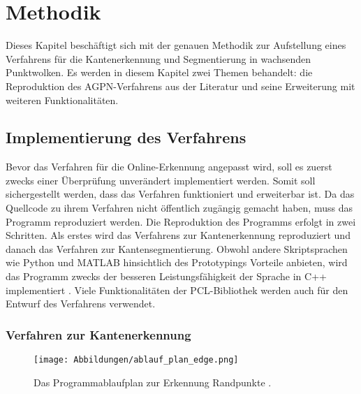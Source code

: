 

\chapter{Methodik} \label{Methodik}
Dieses Kapitel beschäftigt sich mit der genauen Methodik zur Aufstellung eines Verfahrens für die Kantenerkennung und Segmentierung in wachsenden Punktwolken. Es werden in diesem Kapitel zwei Themen behandelt: die Reproduktion des AGPN-Verfahrens aus der Literatur und seine Erweiterung mit weiteren Funktionalitäten. 

\section{Implementierung des Verfahrens}
Bevor das Verfahren für die Online-Erkennung angepasst wird, soll es zuerst zwecks einer Überprüfung unverändert implementiert werden. Somit soll sichergestellt werden, dass das Verfahren funktioniert und erweiterbar ist. Da \textcite{ni_edge_2016} das Quellcode zu ihrem Verfahren nicht öffentlich zugängig gemacht haben, muss das Programm reproduziert werden. Die Reproduktion des Programms erfolgt in zwei Schritten. Als erstes wird das Verfahrens zur Kantenerkennung reproduziert und danach das Verfahren zur Kantensegmentierung. Obwohl andere Skriptsprachen wie Python und MATLAB hinsichtlich des Prototypings Vorteile anbieten, wird das Programm zwecks der besseren Leistungsfähigkeit der Sprache in C++ implementiert \autocite{svensson_performance_2021}. Viele Funktionalitäten der PCL-Bibliothek \autocite{rusu_3d_2011} werden auch für den Entwurf des Verfahrens verwendet.

\subsection{Verfahren zur Kantenerkennung} \label{edge_detection_reprod}

\begin{figure}[h]
	\texttt{[image: Abbildungen/ablauf\_plan\_edge.png]}
	\centering
	\caption[Programmablaufplan zur Kantenerkennung]{Das Programmablaufplan zur Erkennung Randpunkte \autocite{ni_edge_2016}.}
	\label{flow_chart}
\end{figure}


